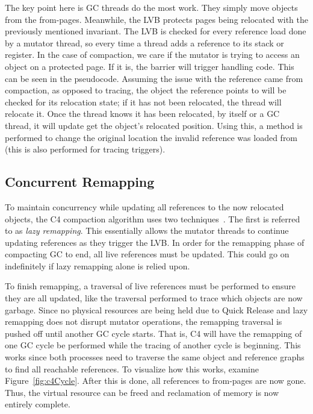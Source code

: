 \documentclass{sig-alternate}
\begin{document}
The key point here is GC threads do the most work. They simply
move objects from the from-pages. Meanwhile, the LVB protects pages being 
relocated with the previously mentioned invariant. The LVB is checked for every reference load
done by a mutator thread, so every time a thread adds a reference to its 
stack or register. In the case of compaction, we care if the mutator is trying 
to access an object on a protected page. If it is, the barrier will trigger 
handling code. This can be seen in the pseudocode. Assuming the issue with the
reference came from compaction, as opposed to tracing, the object the reference
points to will be checked for its relocation state; if it has not been relocated, the
thread will relocate it. Once the thread knows it has been relocated, by itself
or a GC thread, it will update get the object's relocated position. Using this,
a method is performed to change the original location
the invalid reference was loaded from (this is also performed for tracing triggers).



\subsection{Concurrent Remapping}
\label{sec:c4Remapping}

To maintain concurrency while updating all references to the now relocated
objects, the C4 compaction algorithm uses two techniques~\cite{Tene:C4}. The first is
referred to as \emph{lazy remapping}. This essentially allows the mutator
threads to continue updating references as they trigger the LVB. In order for
the remapping phase of compacting GC to end, all live references must be updated.
This could go on indefinitely if lazy remapping alone is relied upon.

To finish remapping, a traversal of live references must be performed to
ensure they are all updated, like the traversal performed to trace which
objects are now garbage. Since no physical resources are being held due
to Quick Release and lazy remapping does not disrupt mutator operations,
the remapping traversal is pushed off until another GC cycle starts. That
is, C4 will have the remapping of one GC cycle be performed while the tracing
of another cycle is beginning. This works since both processes need to traverse
the same object and reference graphs to find all reachable references. To
visualize how this works, examine Figure~\ref{fig:c4Cycle}. After this
is done, all references to from-pages are now gone. Thus, the virtual resource
can be freed and reclamation of memory is now entirely complete. 
\end{document}
